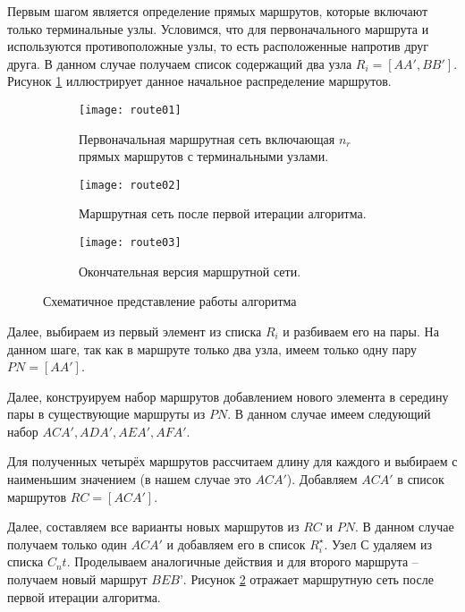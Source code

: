 Первым шагом является определение прямых маршрутов, которые включают только терминальные узлы. Условимся, 
что для первоначального маршрута и используются противоположные узлы, то есть расположенные напротив друг 
друга. В данном случае получаем список содержащий два узла \( R_i = [AA', BB'] \). Рисунок 
\ref{fig:route_first} иллюстрирует данное начальное распределение маршрутов.

\begin{figure}[ht!]
    \centering
    \begin{subfigure}{0.3\textwidth}
        \centering
        \texttt{[image: route01]}
        \caption{Первоначальная маршрутная сеть включающая \( n_r \) прямых маршрутов с терминальными узлами.}
        \label{fig:route_first}
    \end{subfigure}
    \begin{subfigure}{0.3\textwidth}
        \centering
        \texttt{[image: route02]}
        \caption{Маршрутная сеть после первой итерации алгоритма.}
        \label{fig:route_second}
    \end{subfigure}
    \begin{subfigure}{0.3\textwidth}
        \centering
        \texttt{[image: route03]}
        \caption{Окончательная версия маршрутной сети.}
        \label{fig:route_third}
    \end{subfigure}
    \caption{Схематичное представление работы алгоритма}
    \label{fig:route}
\end{figure}

Далее, выбираем из первый элемент из списка \( R_i \) и разбиваем его на пары. На данном шаге, так как в 
маршруте только два узла, имеем только одну пару \( PN = [AA'] \).

Далее, конструируем набор маршрутов добавлением нового элемента в середину пары в существующие маршруты из 
\( PN \). В данном случае имеем следующий набор \( ACA', ADA', AEA', AFA' \).

Для полученных четырёх маршрутов рассчитаем длину для каждого и выбираем с наименьшим значением 
(в нашем случае это \( ACA' \)). Добавляем \( ACA' \) в список маршрутов \( RC = [ACA'] \).

Далее, составляем все варианты новых маршрутов из \( RC \) и \( PN \). В данном случае получаем только один 
\( ACA' \) и добавляем его в список \( R^{\star}_{i} \). Узел \( С \) удаляем из списка \( C_nt \).
Проделываем аналогичные действия и для второго маршрута -- получаем новый маршрут \( BEB’ \).
Рисунок \ref{fig:route_second} отражает маршрутную сеть после первой итерации алгоритма.

